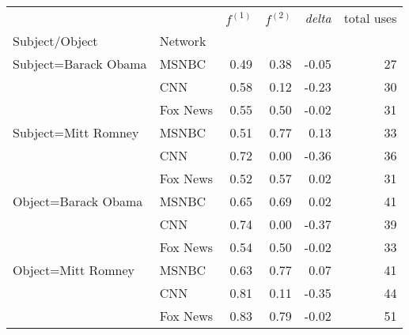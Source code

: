\begin{tabular}{llrrrr}
\toprule
                    &     & $f^{(1)}$ & $f^{(2)}$ & \emph{delta} & total uses \\
Subject/Object & Network &           &           &            &            \\
\midrule
Subject=Barack Obama & MSNBC &      0.49 &      0.38 &      -0.05 &         27 \\
                    & CNN &      0.58 &      0.12 &      -0.23 &         30 \\
                    & Fox News &      0.55 &      0.50 &      -0.02 &         31 \\
\hline
Subject=Mitt Romney & MSNBC &      0.51 &      0.77 &       0.13 &         33 \\
                    & CNN &      0.72 &      0.00 &      -0.36 &         36 \\
                    & Fox News &      0.52 &      0.57 &       0.02 &         31 \\
\hline
Object=Barack Obama & MSNBC &      0.65 &      0.69 &       0.02 &         41 \\
                    & CNN &      0.74 &      0.00 &      -0.37 &         39 \\
                    & Fox News &      0.54 &      0.50 &      -0.02 &         33 \\
\hline
Object=Mitt Romney & MSNBC &      0.63 &      0.77 &       0.07 &         41 \\
                    & CNN &      0.81 &      0.11 &      -0.35 &         44 \\
                    & Fox News &      0.83 &      0.79 &      -0.02 &         51 \\
\bottomrule
\end{tabular}
